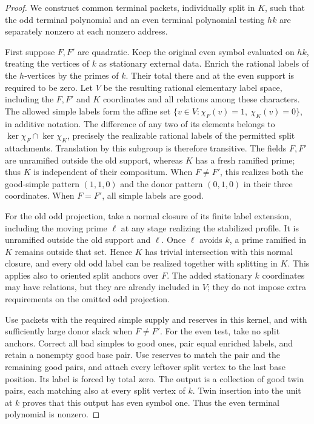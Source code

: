 \begin{proof}
We construct common terminal packets, individually split in $K$, such
that the odd terminal polynomial and an even terminal polynomial testing
$hk$ are separately nonzero at each nonzero address.

First suppose $F,F'$ are quadratic.  Keep the original even symbol
evaluated on $hk$, treating the vertices of $k$ as stationary external
data.  Enrich the rational labels of the $h$-vertices by the primes of
$k$.  Their total there and at the even support is required to be zero.
Let $V$ be the resulting rational elementary label space, including the
$F,F'$ and $K$ coordinates and all relations among these characters.
The allowed simple labels form the affine set
$\{v\in V:\chi_F(v)=1,\ \chi_K(v)=0\}$, in additive notation.
The difference of any two of its elements belongs to
$\ker\chi_F\cap\ker\chi_K$, precisely the realizable rational labels
of the permitted split attachments.  Translation by this subgroup is
therefore transitive.  The fields $F,F'$ are unramified outside the old
support, whereas $K$ has a fresh ramified prime; thus $K$ is independent
of their compositum.  When $F\ne F'$, this realizes both the good-simple
pattern $(1,1,0)$ and the donor pattern $(0,1,0)$ in their three
coordinates.  When $F=F'$, all simple labels are good.

For the old odd projection, take a normal closure of its finite label
extension, including the moving prime $\ell$ at any stage realizing the
stabilized profile. It is unramified outside the old support and $\ell$.  Once $\ell$ avoids
$k$, a prime ramified in $K$ remains outside that set.  Hence $K$
has trivial intersection with this normal closure, and every old odd
label can be realized together with splitting in $K$.  This applies
also to oriented split anchors over $F$.  The added stationary $k$
coordinates may have relations, but they are already included in $V$;
they do not impose extra requirements on the omitted odd projection.

Use packets with the required simple supply and reserves in this kernel,
and with sufficiently large donor slack when $F\ne F'$. For the even
test, take no split anchors.
Correct all bad simples to good ones, pair equal enriched labels, and
retain a nonempty good base pair.  Use reserves to match the pair and
the remaining good pairs, and attach every leftover split vertex to the
last base position.  Its label is forced by total zero.  The output is
a collection of good twin pairs, each matching also at every split
vertex of $k$.  Twin insertion into the unit at $k$ proves that this
output has even symbol one.  Thus the even terminal polynomial is
nonzero.


\end{proof}
